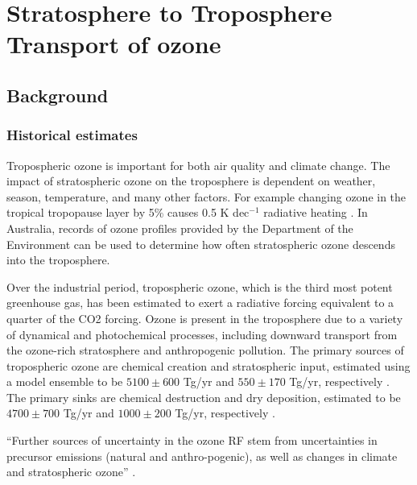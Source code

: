 
\chapter{Stratosphere to Troposphere Transport of ozone} %
\label{ch_o3}

\section{Background}
  \label{ch_o3:sec:ozone}

  \subsection{Historical estimates}
    Tropospheric ozone is important for both air quality and climate change. 
    The impact of stratospheric ozone on the troposphere is dependent on weather, season, temperature, and many other factors. 
    For example changing ozone in the tropical tropopause layer by 5\% causes 0.5 K dec$^{-1}$ radiative heating \citep{Forster2007}.
    In Australia, records of ozone profiles provided by the Department of the Environment can be used to determine how often stratospheric ozone descends into the troposphere.

    Over the industrial period, tropospheric ozone, which is the third most potent greenhouse gas, has been estimated to exert a radiative forcing equivalent to a quarter of the CO2 forcing. 
    Ozone is present in the troposphere due to a variety of dynamical and photochemical processes, including downward  transport from the ozone-rich stratosphere and anthropogenic pollution.
    The primary sources of tropospheric ozone are chemical creation and stratospheric input, estimated using a model ensemble to be $5100\pm600$ Tg/yr and $550\pm170$ Tg/yr, respectively \citep{Stevenson2006}.
    The primary sinks are chemical destruction and dry deposition, estimated to be $4700\pm700$ Tg/yr and $1000\pm200$ Tg/yr, respectively \citep{Stevenson2006}.
    
    ``Further sources of uncertainty in the ozone RF stem from uncertainties in precursor emissions (natural and anthro-pogenic), as well as changes in climate and stratospheric ozone'' \citep{Stevenson2013}.
    
